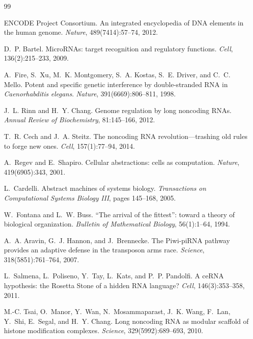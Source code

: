 \documentclass[12pt,a4paper]{article}
\theoremstyle{definition}
\begin{document}
\begin{thebibliography}{99}

ENCODE Project Consortium.
\newblock An integrated encyclopedia of DNA elements in the human genome.
\newblock \emph{Nature}, 489(7414):57--74, 2012.

D.~P. Bartel.
\newblock MicroRNAs: target recognition and regulatory functions.
\newblock \emph{Cell}, 136(2):215--233, 2009.

A.~Fire, S.~Xu, M.~K. Montgomery, S.~A. Kostas, S.~E. Driver, and
  C.~C. Mello.
\newblock Potent and specific genetic interference by double-stranded RNA in
  \emph{Caenorhabditis elegans}.
\newblock \emph{Nature}, 391(6669):806--811, 1998.

J.~L. Rinn and H.~Y. Chang.
\newblock Genome regulation by long noncoding RNAs.
\newblock \emph{Annual Review of Biochemistry}, 81:145--166, 2012.

T.~R. Cech and J.~A. Steitz.
\newblock The noncoding RNA revolution---trashing old rules to forge new ones.
\newblock \emph{Cell}, 157(1):77--94, 2014.

A.~Regev and E.~Shapiro.
\newblock Cellular abstractions: cells as computation.
\newblock \emph{Nature}, 419(6905):343, 2001.

L.~Cardelli.
\newblock Abstract machines of systems biology.
\newblock \emph{Transactions on Computational Systems Biology III}, pages
  145--168, 2005.

W.~Fontana and L.~W. Buss.
\newblock ``The arrival of the fittest'': toward a theory of biological
  organization.
\newblock \emph{Bulletin of Mathematical Biology}, 56(1):1--64, 1994.

A.~A. Aravin, G.~J. Hannon, and J.~Brennecke.
\newblock The Piwi-piRNA pathway provides an adaptive defense in the
  transposon arms race.
\newblock \emph{Science}, 318(5851):761--764, 2007.

L.~Salmena, L.~Poliseno, Y.~Tay, L.~Kats, and P.~P. Pandolfi.
\newblock A ceRNA hypothesis: the Rosetta Stone of a hidden RNA language?
\newblock \emph{Cell}, 146(3):353--358, 2011.

M.-C. Tsai, O.~Manor, Y.~Wan, N.~Mosammaparast, J.~K. Wang,
  F.~Lan, Y.~Shi, E.~Segal, and H.~Y. Chang.
\newblock Long noncoding RNA as modular scaffold of histone modification
  complexes.
\newblock \emph{Science}, 329(5992):689--693, 2010.


\end{thebibliography}
\end{document}
